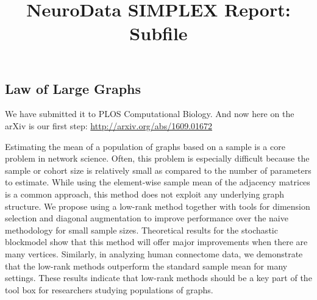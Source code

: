 \documentclass[simplex.tex]{subfiles}
\title{NeuroData SIMPLEX Report: Subfile}
\begin{document}

\subsection{Law of Large Graphs}

We have submitted it to PLOS Computational Biology. And now here
on the arXiv is our first step:
\href{http://arxiv.org/abs/1609.01672}{http://arxiv.org/abs/1609.01672}

Estimating the mean of a population of graphs based on a sample
is a core problem in network science. Often, this problem is
especially difficult because the sample or cohort size is
relatively small as compared to the number of parameters to
estimate. While using the element-wise sample mean of the
adjacency matrices is a common approach, this method does not
exploit any underlying graph structure. We propose using a
low-rank method together with tools for dimension selection and
diagonal augmentation to improve performance over the naive
methodology for small sample sizes. Theoretical results for the
stochastic blockmodel show that this method will offer major
improvements when there are many vertices. Similarly, in
analyzing human connectome data, we demonstrate that the low-rank
methods outperform the standard sample mean for many settings.
These results indicate that low-rank methods should be a key part
of the tool box for researchers studying populations of graphs.
\end{document}
